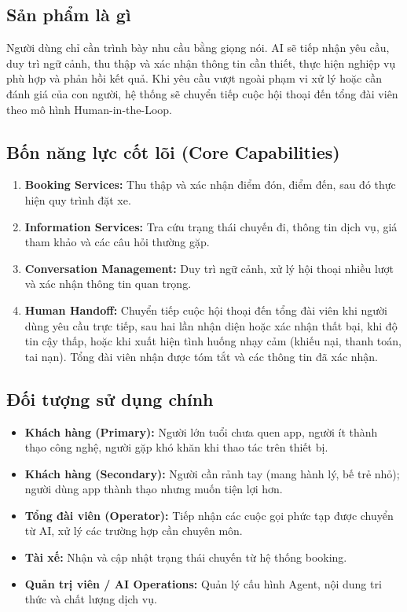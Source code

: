 \documentclass[12pt,a4paper]{article}
\begin{document}
\subsection*{Sản phẩm là gì}

Người dùng chỉ cần trình bày nhu cầu bằng giọng nói. AI sẽ tiếp nhận yêu cầu, duy trì ngữ cảnh, thu thập và xác nhận thông tin cần thiết, thực hiện nghiệp vụ phù hợp và phản hồi kết quả. Khi yêu cầu vượt ngoài phạm vi xử lý hoặc cần đánh giá của con người, hệ thống sẽ chuyển tiếp cuộc hội thoại đến tổng đài viên theo mô hình Human-in-the-Loop.

\subsection*{Bốn năng lực cốt lõi (Core Capabilities)}

\begin{enumerate}
  \item \textbf{Booking Services:} Thu thập và xác nhận điểm đón, điểm đến, sau đó thực hiện quy trình đặt xe.
  \item \textbf{Information Services:} Tra cứu trạng thái chuyến đi, thông tin dịch vụ, giá tham khảo và các câu hỏi thường gặp.
  \item \textbf{Conversation Management:} Duy trì ngữ cảnh, xử lý hội thoại nhiều lượt và xác nhận thông tin quan trọng.
  \item \textbf{Human Handoff:} Chuyển tiếp cuộc hội thoại đến tổng đài viên khi người dùng yêu cầu trực tiếp, sau hai lần nhận diện hoặc xác nhận thất bại, khi độ tin cậy thấp, hoặc khi xuất hiện tình huống nhạy cảm (khiếu nại, thanh toán, tai nạn). Tổng đài viên nhận được tóm tắt và các thông tin đã xác nhận.
\end{enumerate}

\subsection*{Đối tượng sử dụng chính}
\begin{itemize}
  \item \textbf{Khách hàng (Primary):} Người lớn tuổi chưa quen app, người ít thành thạo công nghệ, người gặp khó khăn khi thao tác trên thiết bị.
  \item \textbf{Khách hàng (Secondary):} Người cần rảnh tay (mang hành lý, bế trẻ nhỏ); người dùng app thành thạo nhưng muốn tiện lợi hơn.
  \item \textbf{Tổng đài viên (Operator):} Tiếp nhận các cuộc gọi phức tạp được chuyển từ AI, xử lý các trường hợp cần chuyên môn.
  \item \textbf{Tài xế:} Nhận và cập nhật trạng thái chuyến từ hệ thống booking.
  \item \textbf{Quản trị viên / AI Operations:} Quản lý cấu hình Agent, nội dung tri thức và chất lượng dịch vụ.
\end{itemize}
\end{document}
